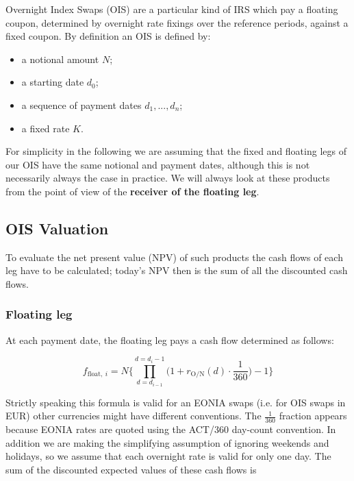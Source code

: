Overnight Index Swaps (OIS) are a particular kind of IRS which pay a floating coupon, determined by overnight rate fixings over the reference periods, against a fixed coupon. By definition an OIS is defined by:

\begin{itemize}
\tightlist
\item
  a notional amount \(N\);
\item
  a starting date \(d_0\);
\item
  a sequence of payment dates \(d_1,...,d_n\);
\item
  a fixed rate \(K\).
\end{itemize}

For simplicity in the following we are assuming that the fixed and floating legs of our OIS have the same notional and payment dates, although this is not necessarily always the case in practice. We will always look at these products from the point of view of the \textbf{receiver of the floating leg}.

\subsection{OIS Valuation}\label{ois-valuation}
To evaluate the net present value (NPV) of such products the cash flows of each leg have to be calculated; today's NPV then is the sum of all the discounted cash flows.

\subsubsection{Floating leg}\label{floating-leg}

At each payment date, the floating leg pays a cash flow determined as follows:

\begin{equation}
f_{\mathrm{float},~i} = N \Bigg\{\prod_{d=d_{i-1}}^{d=d_i-1}\Big(1+r_{\mathrm{O/N}}(d)\cdot\frac{1}{360}\Big) -1 \Bigg\}
\label{eq:floating_ois}
\end{equation}

Strictly speaking this formula is valid for an EONIA swaps (i.e. for OIS swaps in EUR) other currencies might have different conventions. The \(\frac{1}{360}\) fraction appears because EONIA rates are quoted using the ACT/360 day-count convention. In addition we are making the simplifying assumption of ignoring weekends and holidays, so we assume that each overnight rate is valid for only one day. The sum of the discounted expected values of these cash flows is

